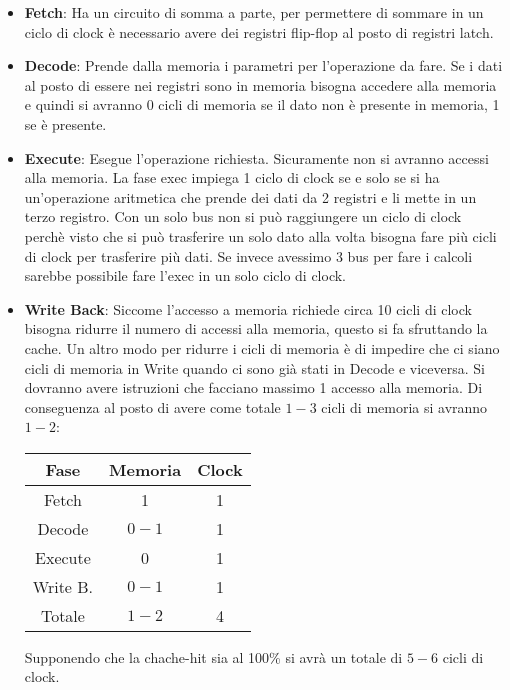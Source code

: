 \documentclass[a4paper]{article}
\theoremstyle{break}
\theoremstyle{break}
\theoremstyle{break}
\theoremstyle{break}
\begin{document}
\begin{itemize}
  \item \textbf{Fetch}: Ha un circuito di somma a parte, per permettere di sommare in
    un ciclo di clock è necessario avere dei registri flip-flop al posto di registri
    latch.
  \item \textbf{Decode}: Prende dalla memoria i parametri per l'operazione da fare. Se
    i dati al posto di essere nei registri sono in memoria bisogna accedere alla
    memoria e quindi si avranno 0 cicli di memoria se il dato non è presente in memoria,
    1 se è presente.
  \item \textbf{Execute}: Esegue l'operazione richiesta. Sicuramente non si avranno
    accessi alla memoria. La fase exec impiega 1 ciclo di clock se e solo se si ha
    un'operazione aritmetica che prende dei dati da 2 registri e li mette in un terzo
    registro. Con un solo bus non si può raggiungere un ciclo di clock perchè visto che
    si può trasferire un solo dato alla volta bisogna fare più cicli di clock per trasferire
    più dati. Se invece avessimo 3 bus per fare i calcoli sarebbe possibile fare l'exec
    in un solo ciclo di clock.
  \item \textbf{Write Back}: Siccome l'accesso a memoria richiede circa 10 cicli di clock bisogna
    ridurre il numero di accessi alla memoria, questo si fa sfruttando la cache. Un altro
    modo per ridurre i cicli di memoria è di impedire che ci siano cicli di memoria
    in Write quando ci sono già stati in Decode e viceversa. Si dovranno avere istruzioni
    che facciano massimo 1 accesso alla memoria. Di conseguenza al posto di avere
    come totale $1-3$ cicli di memoria si avranno $1-2$:
    \begin{table}[H]
      \begin{center}
        \begin{tabular}{c|cc}
          \textbf{Fase} & \textbf{Memoria} & \textbf{Clock} \\
          \hline
          Fetch & 1 & 1 \\
          Decode & $0-1$ & 1 \\
          Execute & 0 & 1 \\
          Write B. & $0-1$ & 1 \\
          \hline
          Totale & $1-2$ & 4 
        \end{tabular}
      \end{center}
    \end{table}

    \noindent Supponendo che la chache-hit sia al 100\% si avrà un totale di
    $5-6$ cicli di clock.
\end{itemize}
\end{document}
